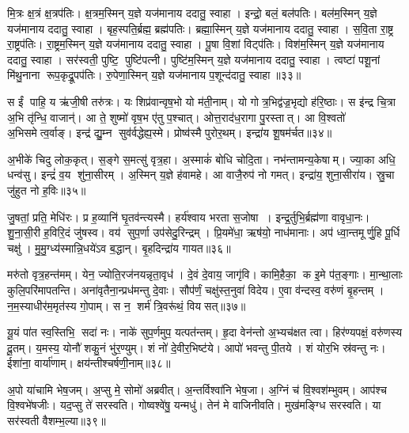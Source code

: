 मि॒त्रः क्ष॒त्रं क्ष॒त्रप॑तिः।
क्ष॒त्रम॒स्मिन् य॒ज्ञे यज॑मानाय ददातु॒ स्वाहा।
इन्द्रो॒ बलं॒ बल॑पतिः।
बल॑म॒स्मिन् य॒ज्ञे यज॑मानाय ददातु॒ स्वाहा।
बृह॒स्पति॒र्ब्रह्म॒ ब्रह्म॑पतिः।
ब्रह्मा॒स्मिन् य॒ज्ञे यज॑मानाय ददातु॒ स्वाहा।
स॒वि॒ता रा॒ष्ट्र रा॒ष्ट्रप॑तिः।
रा॒ष्ट्रम॒स्मिन् य॒ज्ञे यज॑मानाय ददातु॒ स्वाहा।
पू॒षा वि॒शां विट्प॑तिः।
विश॑म॒स्मिन् य॒ज्ञे यज॑मानाय ददातु॒ स्वाहा।
सर॑स्वती॒ पुष्टि॒ पुष्टि॑पत्नी।
पुष्टि॑म॒स्मिन् य॒ज्ञे यज॑मानाय ददातु॒ स्वाहा।
त्वष्टा॑ पशू॒नां मि॑थु॒नाना रूप॒कृद्रू॒पप॑तिः।
रु॒पेणा॒स्मिन् य॒ज्ञे यज॑मानाय प॒शून्द॑दातु॒ स्वाहा॥३३॥\anuvakamend[च॒ स्वाहा॒ साम्राज्यम॒स्मिन् य॒ज्ञे यज॑मानाय ददातु॒ स्वाहा॒ विश॑म॒स्मिन् य॒ज्ञे यज॑मानाय ददातु॒ स्वाहा॑ च॒त्वारि॑ च (अ॒ग्निः सोमो॒ वरु॑णो मि॒त्र इन्द्रो॒ बृह॒स्पति॑ सवि॒ता पू॒षा सर॑स्वती॒ त्वष्टा॒ दश॑ ॥ )]

स ईं पाहि॒ य ऋ॑जी॒षी तरु॑त्रः।
यः शिप्र॑वान्वृष॒भो यो म॑ती॒नाम्।
यो गोत्र॒भिद्व॑ज्र॒भृद्यो ह॑रि॒ष्ठाः।
स इ॑न्द्र चि॒त्रा अ॒भि तृ॑न्धि॒ वाजान्॑।
आ ते॒ शुष्मो॑ वृष॒भ ए॑तु प॒श्चात्।
ओत्त॒राद॑ध॒रागा पु॒रस्तात्।
आ वि॒श्वतो॑ अ॒भिसमेत्व॒र्वाङ्।
इन्द्र॑ द्यु॒म्न सुव॑र्वद्धेह्य॒स्मे।
प्रोष्व॑स्मै पुरोर॒थम्।
इन्द्रा॑य शू॒षम॑र्चत॥३४॥

अ॒भीके॑ चिदु लोक॒कृत्।
स॒ङ्गे स॒मत्सु॑ वृत्र॒हा।
अ॒स्माकं॑ बोधि चोदि॒ता।
नभ॑न्तामन्य॒केषाम्।
ज्या॒का अधि॒ धन्व॑सु।
इन्द्रं॑ व॒य शु॑ना॒सीरम्।
अ॒स्मिन् य॒ज्ञे ह॑वामहे।
आ वाजै॒रुप॑ नो गमत्।
इन्द्रा॑य॒ शुना॒सीरा॑य।
स्रु॒चा जु॑हुत नो ह॒विः॥३५॥

जु॒षतां॒ प्रति॒ मेधि॑रः।
प्र ह॒व्यानि॑ घृ॒तव॑न्त्यस्मै।
हर्य॑श्वाय भरता स॒जोषा।
इन्द्र॒र्तुभि॒र्ब्रह्म॑णा वावृधा॒नः।
शु॒ना॒सी॒री ह॒विरि॒दं जु॑षस्व।
वय॑ सुप॒र्णा उप॑सेदु॒रिन्द्रम्।
प्रि॒यमे॑धा॒ ऋष॑यो॒ नाध॑मानाः।
अप॑ ध्वा॒न्तमूर्णु॒हि पू॒र्धि चक्षु॑।
मु॒मु॒ग्ध्य॑स्मान्नि॒धये॑ऽव ब॒द्धान्।
बृ॒हदिन्द्रा॑य गायत॥३६॥

मरु॑तो वृत्र॒हन्त॑मम्।
येन॒ ज्योति॒रज॑नयन्नृता॒वृध॑।
दे॒वं दे॒वाय॒ जागृ॑वि।
कामि॒हैका॒ क इ॒मे प॑त॒ङ्गाः।
मा॒न्था॒लाः कुलि॒परि॑मापतन्ति।
अना॑वृतैना॒न्प्रध॑मन्तु दे॒वाः।
सौप॑र्णं॒ चक्षु॑स्त॒नुवा॑ विदेय।
ए॒वा व॑न्दस्व॒ वरु॑णं बृ॒हन्तम्।
न॒म॒स्याधीर॑म॒मृत॑स्य गो॒पाम्।
स न॒ शर्म॑ त्रि॒वरू॑थं॒ वियसत्॥३७॥

यू॒यं पा॑त स्व॒स्तिभि॒ सदा॑ नः।
नाके॑ सुप॒र्णमुप॒ यत्पत॑न्तम्।
हृ॒दा वेन॑न्तो अ॒भ्यच॑क्षत त्वा।
हिर॑ण्यपक्षं॒ वरु॑णस्य दू॒तम्।
य॒मस्य॒ योनौ॑ शकु॒नं भु॑र॒ण्युम्।
शं नो॑ दे॒वीर॒भिष्ट॑ये।
आपो॑ भवन्तु पी॒तये।
शं योर॒भि स्र॑वन्तु नः।
ईशा॑ना॒ वार्या॑णाम्।
क्षय॑न्तीश्चर्\mbox{}षणी॒नाम्॥३८॥

अ॒पो या॑चामि भेष॒जम्।
अ॒प्सु मे॒ सोमो॑ अब्रवीत्।
अ॒न्तर्विश्वा॑नि भेष॒जा।
अ॒ग्निं च॑ वि॒श्वश॑म्भुवम्।
आप॑श्च वि॒श्वभे॑षजीः।
यद॒प्सु ते॑ सरस्वति।
गोष्वश्वे॑षु॒ यन्मधु॑।
तेन॑ मे वाजिनीवति।
मुख॑मङ्ग्धि सरस्वति।
या सर॑स्वती वैशम्भ॒ल्या॥३९॥

